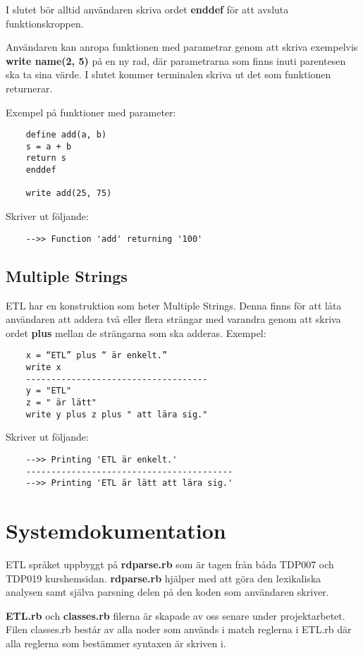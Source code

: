 \documentclass{TDP019mall}
\begin{document}
\begin{enumerate}
I slutet bör alltid användaren skriva ordet \textbf{enddef} för att avsluta funktionskroppen. 
 
Användaren kan anropa funktionen med parametrar genom att skriva exempelvis \textbf{write name(2, 5)} på en ny rad, där parametrarna 
som finns inuti parentesen ska ta sina värde. I slutet kommer terminalen skriva ut det som funktionen returnerar.  
 
 
Exempel på funktioner med parameter:
\begin{verbatim}
    define add(a, b)
    s = a + b
    return s
    enddef

    write add(25, 75)
\end{verbatim}
Skriver ut följande:
\begin{verbatim}
    -->> Function 'add' returning '100'
\end{verbatim}
\end{enumerate}



\subsection{Multiple Strings}
ETL har en konstruktion som heter Multiple Strings. Denna finns för att låta användaren att addera två eller flera strängar med 
varandra genom att skriva ordet \textbf{plus} mellan de strängarna som ska adderas.
Exempel: 
\begin{verbatim}
    x = “ETL” plus “ är enkelt.”
    write x
    ------------------------------------
    y = "ETL"
    z = " är lätt"
    write y plus z plus " att lära sig."
\end{verbatim}
 
Skriver ut följande:
\begin{verbatim}
    -->> Printing 'ETL är enkelt.'
    -----------------------------------------
    -->> Printing 'ETL är lätt att lära sig.'
\end{verbatim}



\section{Systemdokumentation}
ETL språket uppbyggt på \textbf{rdparse.rb} som är tagen från båda TDP007 och TDP019 kurshemsidan. \textbf{rdparse.rb} hjälper med att göra den lexikaliska 
analysen samt själva parsning delen på den koden som användaren skriver. 

\textbf{ETL.rb} och \textbf{classes.rb} filerna är skapade av oss senare under projektarbetet. Filen classes.rb består av alla noder 
som används i match reglerna i ETL.rb där alla reglerna som bestämmer syntaxen är skriven i.  
\end{document}
